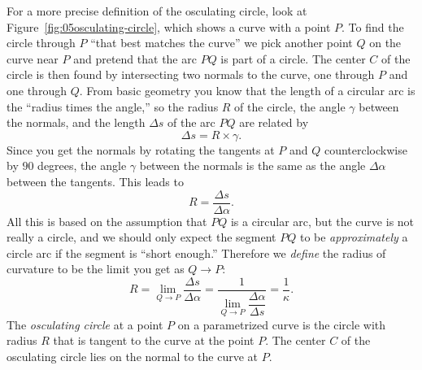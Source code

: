 For a more precise definition of the osculating circle, look at
Figure~\ref{fig:05osculating-circle}, which shows a curve with a point $P$.  To
find the circle through $P$ ``that best matches the curve'' we pick another
point $Q$ on the curve near $P$ and pretend that the arc $PQ$ is part of a
circle.  The center $C$ of the circle is then found by intersecting two normals
to the curve, one through $P$ and one through $Q$.  From basic geometry you know
that the length of a circular arc is the ``radius times the angle,'' so the
radius $R$ of the circle, the angle $\gamma$ between the normals, and the length
$\Delta s$ of the arc $PQ$ are related by
\[
\Delta s = R\times \gamma.
\]
Since you get the normals by rotating the tangents at $P$ and $Q$
counterclockwise by $90$ degrees, the angle $\gamma$ between the normals is the
same as the angle $\Delta \alpha$ between the tangents.  This leads to
\marginpar{ }%
\[
R = \frac{\Delta s} {\Delta\alpha}.
\]
All this is based on the assumption that $PQ$ is a circular arc, but the curve
is not really a circle, and we should only expect the segment $PQ$ to be
\textit{approximately} a circle arc if the segment is ``short enough.''
Therefore we \textit{define} the radius of curvature to be the limit you get as
$Q\to P$:
\begin{equation}
  R  = \lim_{Q\to P} \frac{\Delta s} {\Delta\alpha}
  = \frac{1} {\lim_{Q\to P} \dfrac{\Delta\alpha} {\Delta s}}
  = \frac{1} {\kappa}.
\end{equation}
The \emph{osculating circle} at a point $P$ on a parametrized curve is
the circle with radius $R$ that is tangent to the curve at the point $P$.  The
center $C$ of the osculating circle lies on the normal to the curve at $P$.








